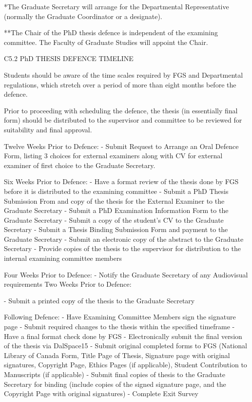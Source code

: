 \documentclass{article}
\begin{document}
*The Graduate Secretary will arrange for the Departmental Representative (normally the Graduate Coordinator or a designate).

**The Chair of the PhD thesis defence is independent of the examining committee. The Faculty of Graduate Studies will appoint the Chair.

C5.2	PhD THESIS DEFENCE TIMELINE

Students should be aware of the time scales required by FGS and Departmental regulations, which stretch over a period of more than eight months before the defence.

Prior to proceeding with scheduling the defence, the thesis (in essentially final form) should be distributed to the supervisor and committee to be reviewed for suitability and final approval.

Twelve Weeks Prior to Defence:
-	Submit Request to Arrange an Oral Defence Form, listing 3 choices for external examiners along with CV for external examiner of first choice to the Graduate Secretary.

Six Weeks Prior to Defence:
-	Have a format review of the thesis done by FGS before it is distributed to the examining committee
-	Submit a PhD Thesis Submission From and copy of the thesis for the External Examiner to the Graduate Secretary
-	Submit a PhD Examination Information Form to the Graduate Secretary
-	Submit a copy of the student’s CV to the Graduate Secretary
-	Submit a Thesis Binding Submission Form and payment to the Graduate Secretary
-	Submit an electronic copy of the abstract to the Graduate Secretary
-	Provide copies of the thesis to the supervisor for distribution to the internal examining committee members

Four Weeks Prior to Defence:
-	Notify the Graduate Secretary of any Audiovisual requirements Two Weeks Prior to Defence:
 

-	Submit a printed copy of the thesis to the Graduate Secretary

Following Defence:
-	Have Examining Committee Members sign the signature page
-	Submit required changes to the thesis within the specified timeframe
-	Have a final format check done by FGS
-	Electronically submit the final version of the thesis via DalSpace15
-	Submit original completed forms to FGS (National Library of Canada Form, Title Page of Thesis, Signature page with original signatures, Copyright Page, Ethics Pages (if applicable), Student Contribution to Manuscripts (if applicable)
-	Submit final copies of thesis to the Graduate Secretary for binding (include copies of the signed signature page, and the Copyright Page with original signatures)
-	Complete Exit Survey
\end{document}

